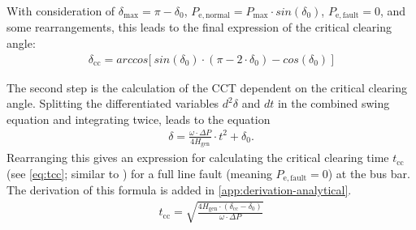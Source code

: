 With consideration of $\delta_\mathrm{max}=\pi-\delta_\mathrm{0}$, $P_\mathrm{e,normal}=P_\mathrm{max} \cdot sin(\delta_\mathrm{0})$, $P_\mathrm{e,fault}=0$, and some rearrangements, this leads to the final expression of the critical clearing angle:
\begin{align}
        \delta_\mathrm{cc}=arccos\big[~sin(\delta_\mathrm{0}) \cdot (\pi-2 \cdot \delta_\mathrm{0})-cos(\delta_\mathrm{0})~\big] \label{eq:delta-cc}
\end{align}

The second step is the calculation of the \acs{CCT} dependent on the critical clearing angle. Splitting the differentiated variables $d^2\delta$ and $dt$ in the combined swing equation and integrating twice, leads to the equation
\begin{align}
        \delta=\frac{\omega \cdot \Delta P}{4 H_\mathrm{gen}} \cdot t^2 + \delta_\mathrm{0}. \nonumber
\end{align}
Rearranging this gives an expression for calculating the critical clearing time $t_\mathrm{cc}$ (see \autoref{eq:tcc}; similar to \textcite{oedingElektrischeKraftwerkeUnd2016}) for a full line fault (meaning $P_\mathrm{e,fault}=0$) at the bus bar. The derivation of this formula is added in \autoref{app:derivation-analytical}.
\begin{align}
        t_\mathrm{cc}=\sqrt{\frac{4 H_\mathrm{gen} \cdot (\delta_\mathrm{cc}-\delta_\mathrm{0})}{\omega \cdot \Delta P}} \label{eq:tcc}
\end{align}

